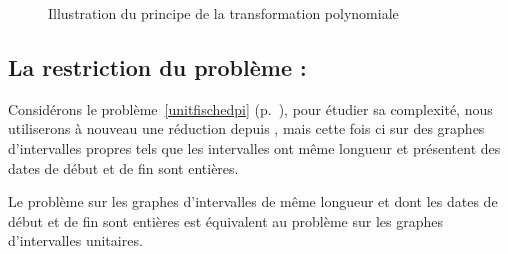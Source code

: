 \begin{ex}
\begin{figure}
\begin{center}
\begin{minipage}[c][5cm][c]{0.55\linewidth}
        \end{minipage}
    \end{center}
    \caption{Illustration du principe de la transformation polynomiale}
    \label{fig_transpoly}
\end{figure}
\end{ex}

\subsection{La restriction du problème : \unitfischedpi{}}
\label{sspb_comp}

Considérons le problème~\ref{unitfischedpi} (p.~\pageref{unitfischedpi}), pour étudier sa
complexité, nous utiliserons à nouveau une réduction depuis \precolor{}, mais cette fois ci sur des
graphes d'intervalles propres tels que les intervalles ont même longueur et présentent des dates de
début et de fin sont entières.

\begin{nprop}
    Le problème \precolor{} sur les graphes d'intervalles de même longueur et dont les dates de début
    et de fin sont entières est équivalent au problème \precolor{} sur les graphes d'intervalles
    unitaires.
\end{nprop}

